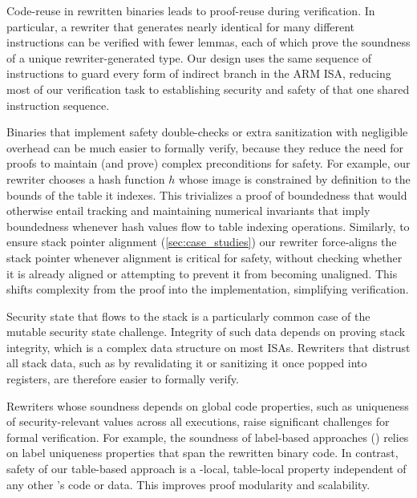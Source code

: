 Code-reuse in rewritten binaries leads to proof-reuse during verification.
In particular, a rewriter that generates nearly identical \Blocks for many different instructions can be verified with fewer lemmas, each of which prove the soundness of a unique rewriter-generated \Block type.
Our design uses the same sequence of instructions to guard every form of indirect branch in the ARM ISA,
reducing most of our verification task to establishing security and safety of that one shared instruction sequence.


Binaries that implement safety double-checks or extra sanitization with negligible overhead can be much easier to formally verify, because they reduce the need for proofs to maintain (and prove) complex preconditions for safety.
For example, our rewriter chooses a hash function $h$ whose image is constrained by definition to the bounds of the table it indexes.
This trivializes a proof of boundedness that would otherwise entail tracking and maintaining numerical invariants that imply boundedness whenever hash values flow to table indexing operations.
Similarly, to ensure stack pointer alignment (\autoref{sec:case_studies}) our rewriter force-aligns the stack pointer whenever alignment is critical for safety, without checking whether it is already aligned or attempting to prevent it from becoming unaligned.
This shifts complexity from the proof into the implementation, simplifying verification.

Security state that flows to the stack is a particularly common case of the mutable security state challenge.
Integrity of such data depends on proving stack integrity, which is a complex data structure on most ISAs\@.
Rewriters that distrust all stack data, such as by revalidating it or sanitizing it once popped into registers, are therefore easier to formally verify.

Rewriters whose soundness depends on global code properties, such as uniqueness of security-relevant values across all executions, raise significant challenges for formal verification.
For example, the soundness of label-based approaches (\cf \cite{abadi_cfi}) relies on label uniqueness properties that span the rewritten binary code.
In contrast, safety of our table-based approach is a \Block-local, table-local property independent of any other \Block's code or data.
This improves proof modularity and scalability.

